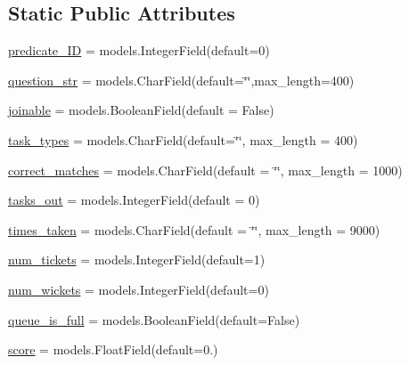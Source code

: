 \subsection*{Static Public Attributes}
\begin{DoxyCompactItemize}
\item 
\mbox{\hyperlink{classdynamicfilterapp_1_1models_1_1_predicate_a283dd268e033ffc2def84793b57df07f}{predicate\+\_\+\+ID}} = models.\+Integer\+Field(default=0)
\item 
\mbox{\hyperlink{classdynamicfilterapp_1_1models_1_1_predicate_a5b127c486dedc27a240e91e6007e5b67}{question\+\_\+str}} = models.\+Char\+Field(default=\char`\"{}\char`\"{},max\+\_\+length=400)
\item 
\mbox{\hyperlink{classdynamicfilterapp_1_1models_1_1_predicate_a8f7c0a6c64622e38ed181ec1519669f1}{joinable}} = models.\+Boolean\+Field(default = False)
\item 
\mbox{\hyperlink{classdynamicfilterapp_1_1models_1_1_predicate_a24192fa356f5262f109cd5e03aabcb63}{task\+\_\+types}} = models.\+Char\+Field(default=\char`\"{}\char`\"{}, max\+\_\+length = 400)
\item 
\mbox{\hyperlink{classdynamicfilterapp_1_1models_1_1_predicate_afa7f671131faeb023ff23ff8593cc029}{correct\+\_\+matches}} = models.\+Char\+Field(default = \char`\"{}\char`\"{}, max\+\_\+length = 1000)
\item 
\mbox{\hyperlink{classdynamicfilterapp_1_1models_1_1_predicate_a3f60ead9e071700c26f1b3316e21cfab}{tasks\+\_\+out}} = models.\+Integer\+Field(default = 0)
\item 
\mbox{\hyperlink{classdynamicfilterapp_1_1models_1_1_predicate_ae9c49aab3c3e87c9686a0d941205d129}{times\+\_\+taken}} = models.\+Char\+Field(default = \char`\"{}\char`\"{}, max\+\_\+length = 9000)
\item 
\mbox{\hyperlink{classdynamicfilterapp_1_1models_1_1_predicate_a591cb1f50f5ceab96242c91732b52479}{num\+\_\+tickets}} = models.\+Integer\+Field(default=1)
\item 
\mbox{\hyperlink{classdynamicfilterapp_1_1models_1_1_predicate_a318c32bc04e208718aafdebe2c988f2a}{num\+\_\+wickets}} = models.\+Integer\+Field(default=0)
\item 
\mbox{\hyperlink{classdynamicfilterapp_1_1models_1_1_predicate_a65d900ce290e9cb7df3008e0ed2c2fb7}{queue\+\_\+is\+\_\+full}} = models.\+Boolean\+Field(default=False)
\item 
\mbox{\hyperlink{classdynamicfilterapp_1_1models_1_1_predicate_a9fa1482cd696e2f0c104e04a9d46a29d}{score}} = models.\+Float\+Field(default=0.)

\end{DoxyCompactItemize}

